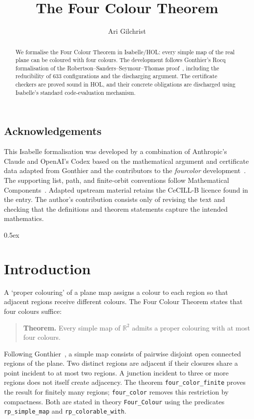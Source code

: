 \documentclass[11pt,a4paper]{article}
\begin{document}
\title{The Four Colour Theorem}
\author{Ari Gilchrist}
\maketitle

\begin{abstract}
  We formalise the Four Colour Theorem in Isabelle/HOL: every simple map of the
  real plane can be coloured with four colours. The development follows
  Gonthier's Rocq formalisation of the Robertson--Sanders--Seymour--Thomas
  proof~\cite{rsst1997},
  including the reducibility of 633 configurations and the discharging argument.
  The certificate checkers are proved sound in HOL, and their concrete obligations
  are discharged using Isabelle's standard code-evaluation mechanism.
\end{abstract}

\subsection*{Acknowledgements}
This Isabelle formalisation was developed by a combination of
Anthropic's Claude and OpenAI's Codex based on the mathematical argument and certificate
data adapted from Gonthier and the contributors to the \emph{fourcolor}
development~\cite{gonthier-fourcolor}. The supporting list, path, and finite-orbit
conventions follow Mathematical Components~\cite{mathcomp}.
Adapted upstream material retains the
CeCILL-B licence found in the entry. The author's contribution
consists only of revising the text and checking that the definitions and theorem statements
capture the intended mathematics.

\tableofcontents

\parindent 0pt\parskip 0.5ex

\section{Introduction}

A `proper colouring' of a plane map assigns a colour to each region so that
adjacent regions receive different colours. The Four Colour Theorem states
that four colours suffice:

\begin{quote}
  \textbf{Theorem.} Every simple map of $\mathbb{R}^2$ admits a proper colouring
  with at most four colours.
\end{quote}

Following Gonthier~\cite{gonthier2008,gonthier-fourcolor}, a simple map consists of
pairwise disjoint open connected regions of the plane. Two distinct regions are adjacent if their closures share
a point incident to at most two regions. A junction incident to three or more
regions does not itself create adjacency. The theorem \texttt{four\_color\_finite}
proves the result for finitely many regions; \texttt{four\_color} removes this
restriction by compactness. Both are stated in theory \texttt{Four\_Colour}
using the predicates \texttt{rp\_simple\_map} and \texttt{rp\_colorable\_with}.
\end{document}
